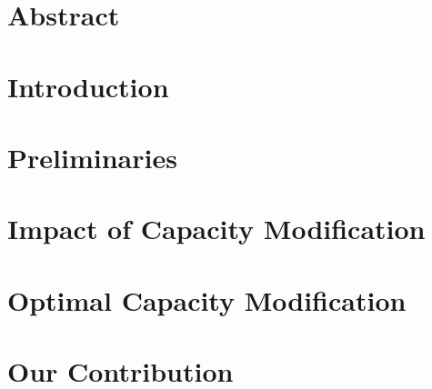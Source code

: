 \documentclass[oneside,openright,titlepage,numbers=noenddot,headinclude,footinclude=true,cleardoublepage=empty,listof=totoc,paper=a4,fontsize=11pt,english,BCOR=5mm]{scrreprt}
\theoremstyle{colon}
\begin{document}
\frenchspacing
\raggedbottom
{}

\pagestyle{plain}

\singlespacing


\chapter*{Abstract}


\onehalfspacing


\cleardoublepage
\pagestyle{scrheadings}
\onehalfspacing

\chapter{Introduction}
\label{chap:Introduction}


\chapter{Preliminaries}
\label{chap:Preliminaries}


\chapter{Impact of Capacity Modification}
\label{chap:Impact-of-Capacity-Modification}


\chapter{Optimal Capacity Modification}
\label{chap:Optimal-Capacity-Modification}


\chapter{Our Contribution}
\label{chap:Our-Contribution}


\cleardoublepage
\appendix

\singlespacing

\cleardoublepage
\end{document}
